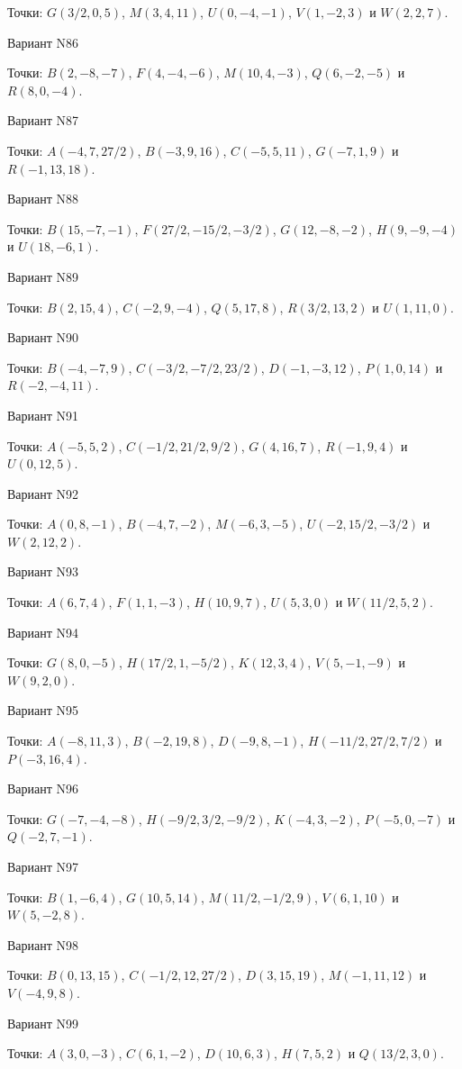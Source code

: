 \documentclass[11pt]{report}
\begin{document}
Точки: $G(3/2, 0, 5)$, $M(3, 4, 11)$, $U(0, -4, -1)$, $V(1, -2, 3)$ и $W(2, 2, 7)$.

Вариант N86

Точки: $B(2, -8, -7)$, $F(4, -4, -6)$, $M(10, 4, -3)$, $Q(6, -2, -5)$ и $R(8, 0, -4)$.

Вариант N87

Точки: $A(-4, 7, 27/2)$, $B(-3, 9, 16)$, $C(-5, 5, 11)$, $G(-7, 1, 9)$ и $R(-1, 13, 18)$.

Вариант N88

Точки: $B(15, -7, -1)$, $F(27/2, -15/2, -3/2)$, $G(12, -8, -2)$, $H(9, -9, -4)$ и $U(18, -6, 1)$.

Вариант N89

Точки: $B(2, 15, 4)$, $C(-2, 9, -4)$, $Q(5, 17, 8)$, $R(3/2, 13, 2)$ и $U(1, 11, 0)$.

Вариант N90

Точки: $B(-4, -7, 9)$, $C(-3/2, -7/2, 23/2)$, $D(-1, -3, 12)$, $P(1, 0, 14)$ и $R(-2, -4, 11)$.

Вариант N91

Точки: $A(-5, 5, 2)$, $C(-1/2, 21/2, 9/2)$, $G(4, 16, 7)$, $R(-1, 9, 4)$ и $U(0, 12, 5)$.

Вариант N92

Точки: $A(0, 8, -1)$, $B(-4, 7, -2)$, $M(-6, 3, -5)$, $U(-2, 15/2, -3/2)$ и $W(2, 12, 2)$.

Вариант N93

Точки: $A(6, 7, 4)$, $F(1, 1, -3)$, $H(10, 9, 7)$, $U(5, 3, 0)$ и $W(11/2, 5, 2)$.

Вариант N94

Точки: $G(8, 0, -5)$, $H(17/2, 1, -5/2)$, $K(12, 3, 4)$, $V(5, -1, -9)$ и $W(9, 2, 0)$.

Вариант N95

Точки: $A(-8, 11, 3)$, $B(-2, 19, 8)$, $D(-9, 8, -1)$, $H(-11/2, 27/2, 7/2)$ и $P(-3, 16, 4)$.

Вариант N96

Точки: $G(-7, -4, -8)$, $H(-9/2, 3/2, -9/2)$, $K(-4, 3, -2)$, $P(-5, 0, -7)$ и $Q(-2, 7, -1)$.

Вариант N97

Точки: $B(1, -6, 4)$, $G(10, 5, 14)$, $M(11/2, -1/2, 9)$, $V(6, 1, 10)$ и $W(5, -2, 8)$.

Вариант N98

Точки: $B(0, 13, 15)$, $C(-1/2, 12, 27/2)$, $D(3, 15, 19)$, $M(-1, 11, 12)$ и $V(-4, 9, 8)$.

Вариант N99

Точки: $A(3, 0, -3)$, $C(6, 1, -2)$, $D(10, 6, 3)$, $H(7, 5, 2)$ и $Q(13/2, 3, 0)$.
\end{document}
